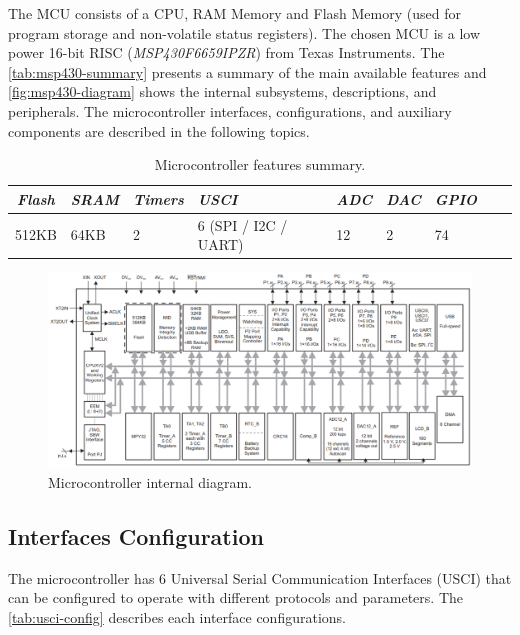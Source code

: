 The MCU consists of a CPU, RAM Memory and Flash Memory (used for program storage and non-volatile status registers). The chosen MCU is a low power 16-bit RISC (\textit{MSP430F6659IPZR}) from Texas Instruments\cite{msp430f6659}. The \autoref{tab:msp430-summary} presents a summary of the main available features and \autoref{fig:msp430-diagram} shows the internal subsystems, descriptions, and peripherals. The microcontroller interfaces, configurations, and auxiliary components are described in the following topics.

\begin{table}[!h]
    \centering
    \begin{tabular}{cllllllll}
        \toprule[1.5pt]
        \textit{Flash} & \textit{SRAM} & \textit{Timers} & \textit{USCI} & \textit{ADC} & \textit{DAC} & \textit{GPIO} \\
        \midrule
        512KB  & 64KB  & 2  & 6 (SPI / I2C / UART)  & 12  & 2  & 74           \\
        \bottomrule[1.5pt]
    \end{tabular}
    \caption{Microcontroller features summary.}
    \label{tab:msp430-summary}
\end{table}

\begin{figure}[!ht]
    \begin{center}
        \includegraphics[width=\textwidth]{figures/msp430-diagram.png}
        \caption{Microcontroller internal diagram.}
        \label{fig:msp430-diagram}
    \end{center}
\end{figure}

\subsection{Interfaces Configuration}

The microcontroller has 6 Universal Serial Communication Interfaces (USCI) that can be configured to operate with different protocols and parameters. The \autoref{tab:usci-config} describes each interface configurations.

